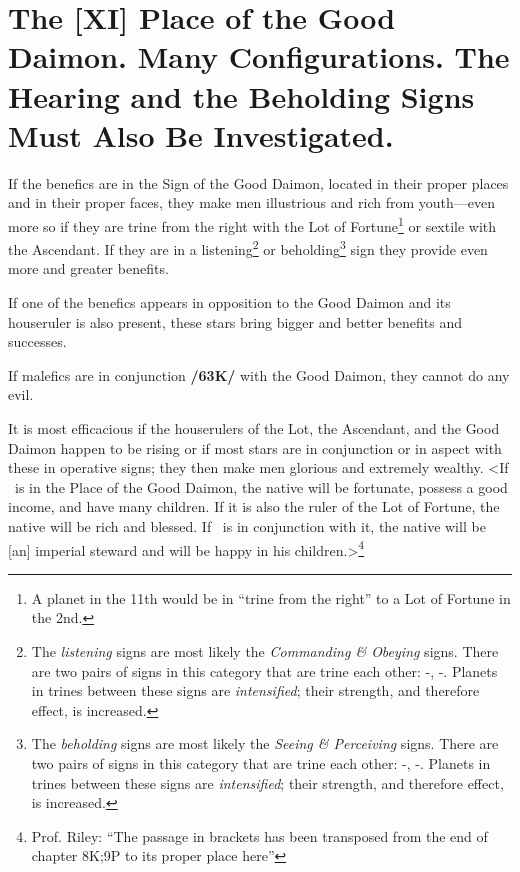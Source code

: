 \section{The [XI] Place of the Good Daimon. Many Configurations. The Hearing and the Beholding Signs Must Also Be Investigated.}
If the benefics are in the Sign of the Good Daimon, located in their proper places and in their proper faces, they make men illustrious and rich from youth—even more so if they are trine from the right with the Lot of Fortune\footnote{A planet in the 11th would be in ``trine from the right'' to a Lot of Fortune in the 2nd.} or sextile with the Ascendant. If they are in a listening\footnote{The \textsl{listening} signs are most likely the \textsl{Commanding \& Obeying} signs. There are two pairs of signs in this category that are trine each  other: \Gemini-\Aquarius, \Leo-\Sagittarius. Planets in trines between these signs are \textsl{intensified}; their strength, and therefore effect, is increased.} or beholding\footnote{The \textsl{beholding} signs are most likely the \textsl{Seeing \& Perceiving} signs. There are two pairs of signs in this category that are trine each  other: \Taurus-\Virgo, \Scorpio-\Pisces. Planets in trines between these signs are \textsl{intensified}; their strength, and therefore effect, is increased.} sign they provide even more and greater benefits. 

If one of the benefics appears in opposition to the Good Daimon and its houseruler is also present, these stars bring bigger and better benefits and successes. 

If malefics are in conjunction \textbf{/63K/} with the Good Daimon, they cannot do any evil. 

It is most efficacious if the houserulers of the Lot, the Ascendant, and the Good Daimon happen to be rising or if most stars are in conjunction or in aspect with these in operative signs; they then make men glorious and extremely wealthy. 
<If \Jupiter\, is in the Place of the Good Daimon, the native will be fortunate, possess a good income, and have many
children. If it is also the ruler of the Lot of Fortune, the native will be rich and blessed. If \Mercury\, is in conjunction with it, the native will be [an] imperial steward and will be happy in his children.>\footnote{Prof. Riley: ``The passage in brackets has been transposed from the end of chapter 8K;9P to its proper place here''}

\newpage